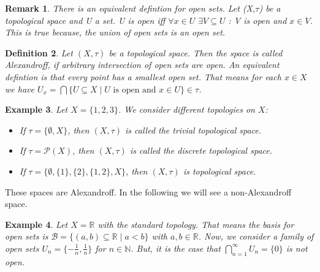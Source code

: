 \documentclass[12pt, a4paper]{scrartcl}
\newtheorem{definition}{Definition}[subsection]
\newtheorem{remark}[definition]{Remark}
\newtheorem{example}[definition]{Example}
\begin{document}
\begin{remark}

    There is an equivalent defintion for open sets. Let (X,$\tau$) be a topological space and U a set.
    U is open iff $\forall x \in U$  $\exists V\subseteq U$ : V is open and $x \in V$. This is true because,
    the union of open sets is an open set.
    
\end{remark}

\begin{definition}
    Let $(X,\tau)$ be a topological space. Then the space is called Alexandroff, if arbitrary intersection of open sets are open.
    An equivalent defintion is that every point has a smallest open set. That means for each $x \in X$ we have 
    $U_x = \bigcap \{U \subseteq X \mid U \mbox{ is open  and } x \in U\} \in \tau$.
\end{definition}
\clearpage
\begin{example}
Let \( X = \{1, 2, 3\} \). We consider different topologies on \( X \):

\begin{itemize}
    \item If \( \tau = \{\emptyset, X\} \), then \( (X, \tau) \) is called the trivial topological space.
    
    \item If \( \tau = \mathcal{P}(X) \), then \( (X, \tau) \) is called the discrete topological space.
    
    \item If \( \tau = \{\emptyset, \{1\}, \{2\}, \{1,2\}, X\} \), then \( (X, \tau) \) is topological space.
\end{itemize}

\end{example}
These spaces are Alexandroff. In the following we will see a non-Alexandroff space.

\begin{example}
    Let $X = \mathbb{R}$ with the standard topology. That means the basis for open sets is $\mathcal{B} = \{(a,b) \subseteq \mathbb{R} \mid a < b\}$ with $a,b \in \mathbb{R}$.
    Now, we consider a family of open sets $U_n = \{-\frac{1}{n}, \frac{1}{n}\}$ for $n \in \mathbb{N}$.
    But, it is the case that $\bigcap_{n=1}^\infty U_n = \{0\}$ is not open.

\end{example}
\end{document}
